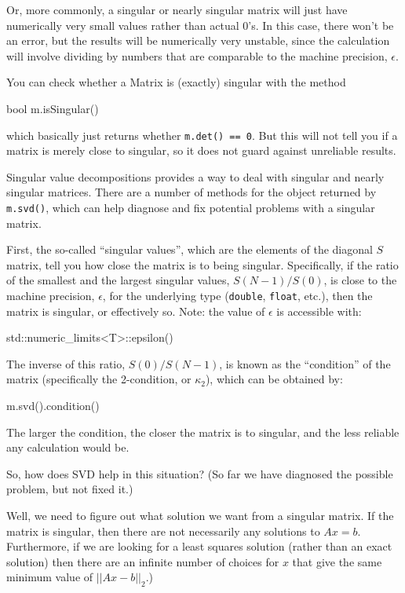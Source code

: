 \documentclass[twoside,letterpaper,11pt]{article}
\renewcommand{\tt}[1]{{\lstinline {#1}}}
\begin{document}
Or, more commonly, a singular or nearly singular matrix
will just have numerically very small values rather than actual 0's.  In this 
case, there won't be an error, but the results will be numerically
very unstable, since the calculation will involve dividing by numbers
that are comparable to the machine precision, $\epsilon$.

You can check whether a Matrix is (exactly) singular with 
the method
\begin{tmvcode}
bool m.isSingular()
\end{tmvcode}
which basically just returns whether \tt{m.det() == 0}.  But this will not
tell you if a matrix is merely close to singular, so it does not guard 
against unreliable results.

Singular value decompositions provides a way to deal with 
singular and nearly singular matrices.  There are a number of methods for the 
object returned by \tt{m.svd()}, which can help diagnose and fix 
potential problems with a singular matrix.

First, the so-called ``singular values'', which are the elements of the
diagonal $S$ matrix, tell you how close the matrix is to being singular.
Specifically, if the ratio of the smallest and the largest singular values,
$S(N-1)/S(0)$, is close to the machine precision, $\epsilon$, for the 
underlying type (\tt{double}, \tt{float}, etc.),
then the matrix is singular, or effectively so.
Note: the value of $\epsilon$ is accessible with:
\begin{tmvcode}
std::numeric_limits<T>::epsilon()
\end{tmvcode}

The inverse of this ratio, $S(0)/S(N-1)$, is known as the ``condition'' of the matrix
(specifically the 2-condition, or $\kappa_2$), which can be obtained by:
\begin{tmvcode}
m.svd().condition()
\end{tmvcode}
The larger the condition, the closer the matrix is to singular, and the
less reliable any calculation would be.

So, how does SVD help in this situation?  (So far we have diagnosed
the possible problem, but not fixed it.)

Well, we need to figure out what solution we want from a singular matrix.
If the matrix is singular, then there are not necessarily any solutions
to $A x = b$.  Furthermore, if we are looking for a least squares solution 
(rather than an exact solution) then there are an infinite number of choices for 
$x$ that give the same minimum value of $||A x-b||_2$.)
\end{document}
